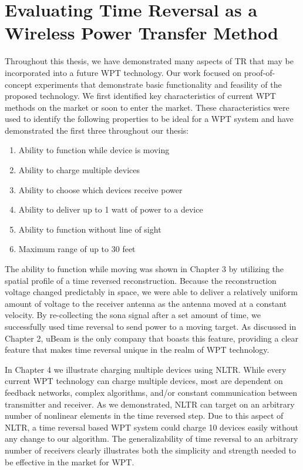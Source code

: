 \section{Evaluating Time Reversal as a Wireless Power Transfer Method}

Throughout this thesis, we have demonstrated many aspects of TR that may be incorporated into a future WPT technology. Our work focused on proof-of-concept experiments that demonstrate basic functionality and feasility of the proposed technology.  We first identified key characteristics of current WPT methods on the market or soon to enter the market. These characteristics were used to identify the following properties to be ideal for a WPT system and have demonstrated the first three throughout our thesis:

\begin{enumerate}
\item Ability to function while device is moving
\item Ability to charge multiple devices 
\item Ability to choose which devices receive power
\item Ability to deliver up to 1 watt of power to a device
\item Ability to function without line of sight
\item Maximum range of up to 30 feet
\end{enumerate}

The ability to function while moving was shown in Chapter 3 by utilizing the spatial profile of a time reversed reconstruction. Because the reconstruction voltage changed predictably in space, we were able to deliver a relatively uniform amount of voltage to the receiver antenna as the antenna moved at a constant velocity. By re-collecting the sona signal after a set amount of time, we successfully used time reversal to send power to a moving target.  As discussed in Chapter 2, uBeam is the only company that boasts this feature, providing a clear feature that makes time reversal unique in the realm of WPT technology.

In Chapter 4 we illustrate charging multiple devices using NLTR. While every current WPT technology can charge multiple devices, most are dependent on feedback networks, complex algorithms, and/or constant communication between transmitter and receiver. As we demonstrated, NLTR can target on an arbitrary number of nonlinear elements in the time reversed step. Due to this aspect of NLTR, a time reversal based WPT system could charge 10 devices easily without any change to our algorithm. The generalizability of time reversal to an arbitrary number of receivers clearly illustrates both the simplicity and strength needed to be effective in the market for WPT.

